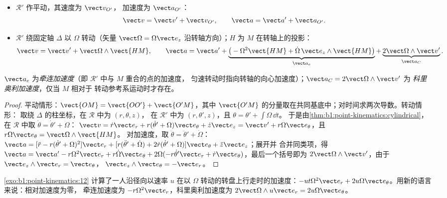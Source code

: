 \begin{theorem}[速度与加速度的合成]\label{thm:b1:non-inertial-frames:composition}
\begin{itemize}
  \item $\mathcal R'$ 作平动，其速度为 $\vect v_{O'}$，
        加速度为 $\vect a_{O'}$：
        \[
        \vect v = \vect v' + \vect v_{O'}, \qquad \vect a = \vect a' + \vect a_{O'} .
        \]
  \item $\mathcal R'$ 绕固定轴 $\Delta$ 以 $\Omega$ 转动（矢量
        $\vect\Omega = \Omega\vect e_z$ 沿转轴方向）；$H$ 为
        $M$ 在转轴上的投影：
        \[
        \vect v = \vect v' + \vect\Omega\wedge\vect{HM}, \qquad
        \vect a = \vect a' + \underbrace{\big(-\Omega^2\vect{HM} + \dot\Omega\,\vect e_z\wedge\vect{HM}\big)}_{\vect a_e}
        + \underbrace{2\vect\Omega\wedge\vect v'}_{\vect a_C} .
        \]
\end{itemize}
$\vect a_e$ 为\emph{牵连加速度}（即
$\mathcal R'$ 中与 $M$ 重合的点的加速度，
匀速转动时指向转轴的向心加速度）；$\vect a_C = 2\vect\Omega\wedge\vect v'$ 为
\emph{科里奥利加速度}，仅当 $M$ 相对于
转动参考系运动时才存在。
\end{theorem}

\begin{proof}
平动情形：$\vect{OM} = \vect{OO'} + \vect{O'M}$，其中
$\vect{O'M}$ 的分量取在共同基底中；对时间求两次导数。转动情形：
取绕 $\Delta$ 的柱坐标，在 $\mathcal R$ 中为 $(r, \theta, z)$，
在 $\mathcal R'$ 中为 $(r, \theta', z)$，且 $\theta = \theta' + \int\Omega\,\dd t$。
于是由\cref{thm:b1:point-kinematics:cylindrical}，在 $\mathcal R$ 中取
$\dot\theta = \dot\theta' + \Omega$：
$\vect v = \dot r\vect e_r + r(\dot\theta' + \Omega)\vect e_\theta + \dot z\vect e_z
= \vect v' + r\Omega\vect e_\theta$，且 $r\Omega\vect e_\theta = \vect\Omega\wedge\vect{HM}$。
对加速度，取 $\ddot\theta = \ddot\theta' + \dot\Omega$：
$\vect a = [\ddot r - r(\dot\theta' + \Omega)^2]\vect e_r + [r(\ddot\theta' + \dot\Omega)
+ 2\dot r(\dot\theta' + \Omega)]\vect e_\theta + \ddot z\vect e_z$；展开并
合并同类项，得 $\vect a = \vect a' - r\Omega^2\vect e_r + r\dot\Omega\vect e_\theta
+ 2\Omega(-r\dot\theta'\vect e_r + \dot r\vect e_\theta)$，最后一个括号即为
$2\vect\Omega\wedge\vect v'$，由于 $\vect e_z\wedge\vect e_r = \vect e_\theta$，
$\vect e_z\wedge\vect e_\theta = -\vect e_r$。
\end{proof}

\begin{example}[在转盘上行走]\label{ex:b1:non-inertial-frames:turntable}
\cref{exo:b1:point-kinematics:12} 计算了一人沿径向以速率 $u$
在以 $\Omega$ 转动的转盘上行走时的加速度：$-ut\Omega^2\vect e_r
+ 2u\Omega\vect e_\theta$。用新的语言来说：相对加速度为零，
牵连加速度为 $-r\Omega^2\vect e_r$，科里奥利加速度为 $2\vect\Omega\wedge u\vect e_r = 2u\Omega\vect e_\theta$。
\end{example}

